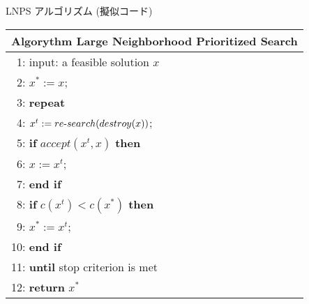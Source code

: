 \documentclass[11pt,dvipdfmx]{beamer}
\begin{document}
\begin{frame}{LNPS アルゴリズム (擬似コード)}
\centering
\begin{tabular}{l}\hline
\textbf{Algorythm} Large Neighborhood Prioritized Search\\\hline
 ~1: input: a feasible solution $x$ \\
 ~2: $x^{*} :=  x$; \\
 ~3: \bf{repeat} \\
 ~4: \quad \quad $x^{t} := re\mathchar`-search(destroy(x))$; \\
 ~5: \quad \quad \textbf{if} $accept(x^{t}, x)$ \textbf{then} \\
 ~6: \quad \quad \quad \quad $x := x^{t}$; \\
 ~7: \quad \quad \textbf{end if} \\
 ~8: \quad \quad \textbf{if} $c(x^{t}) < c(x^{*})$ \textbf{then} \\
 ~9: \quad \quad \quad \quad $x^{*} := x^{t}$; \\
10: \quad \quad \textbf{end if} \\
11: \textbf{until} stop criterion is met \\
12: \textbf{return} $x^{*}$ \\ \hline
\end{tabular}
\end{frame}
\end{document}
